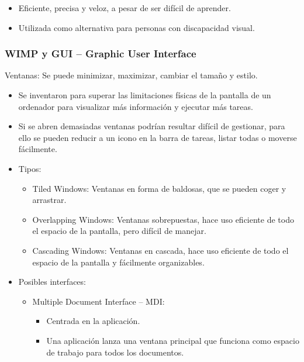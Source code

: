 \documentclass[12pt, twoside, openright]{report} %
\begin{document}
\begin{itemize}
	\item Eficiente, precisa y veloz, a pesar de ser difícil de aprender.
	\item Utilizada como alternativa para personas con discapacidad
	      visual.
\end{itemize}
\pagebreak
\subsubsection{WIMP y GUI -- Graphic User Interface}

Ventanas: Se puede minimizar, maximizar, cambiar el tamaño y
estilo.

\begin{itemize}
	\item Se inventaron para superar las limitaciones físicas de la
	      pantalla de un ordenador para visualizar más información y
	      ejecutar más tareas.
	\item Si se abren demasiadas ventanas podrían resultar difícil de
	      gestionar, para ello se pueden reducir a un icono en la barra
	      de tareas, listar todas o moverse fácilmente.
	\item Tipos:

	      \begin{itemize}
		      \item Tiled Windows: Ventanas en forma de baldosas, que se pueden
		            coger y arrastrar.

		      \item Overlapping Windows: Ventanas sobrepuestas, hace uso
		            eficiente de todo el espacio de la pantalla, pero difícil de
		            manejar.

		      \item Cascading Windows: Ventanas en cascada, hace uso eficiente
		            de todo el espacio de la pantalla y fácilmente organizables.
	      \end{itemize}
	\item Posibles interfaces:

	      \begin{itemize}
		      \item Multiple Document Interface -- MDI:

		            \begin{itemize}
			            \item Centrada en la aplicación.

			            \item Una aplicación lanza una ventana principal que funciona
			                  como espacio de trabajo para todos los documentos.


\end{itemize}
\end{itemize}
\end{itemize}
\end{document}
